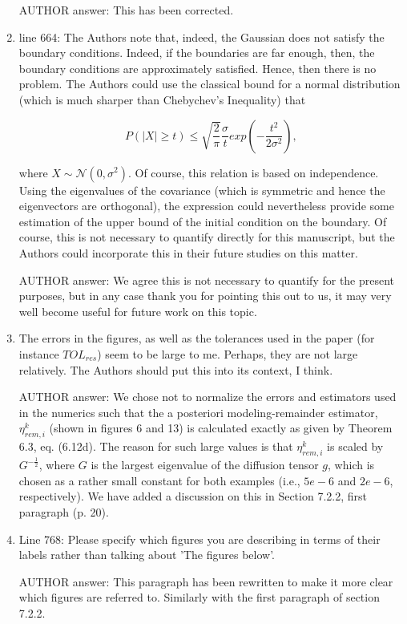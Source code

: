 \documentclass[a4paper,11pt]{scrartcl}
\begin{document}
\begin{enumerate}
AUTHOR answer: This has been corrected.

\item
line 664: The Authors note that, indeed, the Gaussian does not satisfy the boundary conditions. Indeed, if the boundaries are far enough, then, the boundary conditions are approximately satisfied. Hence, then there is no problem. The Authors could use the classical bound for a normal distribution (which is much sharper than Chebychev's Inequality) that

$$P(|X| \ge t ) \le \sqrt{\frac{2}{\pi}} \frac{\sigma}{t} exp(-\frac{t^2}{2 \sigma^2}),$$

where $X \sim \mathcal{N}(0,\sigma^2)$. Of course, this relation is based on independence. Using the eigenvalues of the covariance (which is symmetric and hence the eigenvectors are orthogonal), the expression could nevertheless provide some estimation of the upper bound of the initial condition on the boundary.
Of course, this is not necessary to quantify directly for this manuscript, but the Authors could incorporate this in their future studies on this matter.

AUTHOR answer: We agree this is not necessary to quantify for the present purposes, but in any case thank you for pointing this out to us, it may very well become useful for future work on this topic.

\item
The errors in the figures, as well as the tolerances used in the paper (for instance $TOL_{res}$) seem to be large to me. Perhaps, they are not large relatively. The Authors should put this into its context, I think.

AUTHOR answer: We chose not to normalize the errors and estimators used in the numerics such that the a posteriori modeling-remainder estimator, $\eta_{rem,i}^k$ (shown in figures 6 and 13) is calculated exactly as given by Theorem 6.3, eq. (6.12d). The reason for such large values is that $\eta_{rem,i}^k$ is scaled by $G^{-\frac{1}{2}}$, where $G$ is the largest eigenvalue of the diffusion tensor $g$, which is chosen as a rather small constant for both examples (i.e., $5e-6$ and $2e-6$, respectively). We have added a discussion on this in Section 7.2.2, first paragraph (p. 20).

\item
Line 768: Please specify which figures you are describing in terms of their labels rather than talking about 'The figures below'.

AUTHOR answer: This paragraph has been rewritten to make it more clear which figures are referred to. Similarly with the first paragraph of section 7.2.2.


\end{enumerate}
\end{document}
